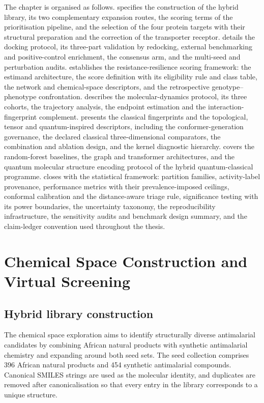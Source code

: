 The chapter is organised as follows.  specifies the construction of the hybrid library, its two complementary expansion routes, the scoring terms of the prioritisation pipeline, and the selection of the four protein targets with their structural preparation and the correction of the transporter receptor.  details the docking protocol, its three-part validation by redocking, external benchmarking and positive-control enrichment, the consensus arm, and the multi-seed and perturbation audits.  establishes the resistance-resilience scoring framework: the estimand architecture, the score definition with its eligibility rule and class table, the network and chemical-space descriptors, and the retrospective genotype--phenotype confrontation.  describes the molecular-dynamics protocol, its three cohorts, the trajectory analysis, the endpoint estimation and the interaction-fingerprint complement.  presents the classical fingerprints and the topological, tensor and quantum-inspired descriptors, including the conformer-generation governance, the declared classical three-dimensional comparators, the combination and ablation design, and the kernel diagnostic hierarchy.  covers the random-forest baselines, the graph and transformer architectures, and the quantum molecular structure encoding protocol of the hybrid quantum-classical programme.  closes with the statistical framework: partition families, activity-label provenance, performance metrics with their prevalence-imposed ceilings, conformal calibration and the distance-aware triage rule, significance testing with its power boundaries, the uncertainty taxonomy, the reproducibility infrastructure, the sensitivity audits and benchmark design summary, and the claim-ledger convention used throughout the thesis.

\section{Chemical Space Construction and Virtual Screening}\label{sec:chemspace_methods}

\subsection{Hybrid library construction}

The chemical space exploration aims to identify structurally diverse antimalarial candidates by combining African natural products with synthetic antimalarial chemistry and expanding around both seed sets. The seed collection comprises \num{396} African natural products and \num{454} synthetic antimalarial compounds. Canonical SMILES strings are used as the molecular identity, and duplicates are removed after canonicalisation so that every entry in the library corresponds to a unique structure.

